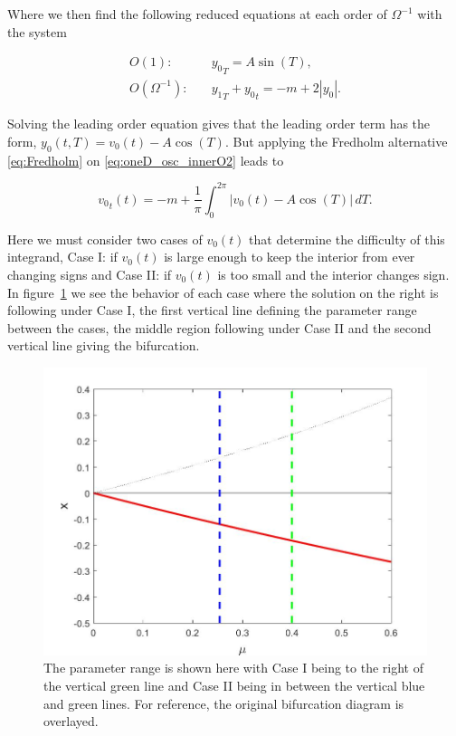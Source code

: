 Where we then find the following reduced equations at each order of $\Omega^{-1}$ with the system

\begin{align}
\label{eq:oneD_osc_innerO1}
O(1):\quad & {y_0}_T = A\sin(T),\\
\label{eq:oneD_osc_innerO2}
O(\Omega^{-1}):\quad & {y_1}_T+{y_0}_t =  -m+2|y_0|.
\end{align}

Solving the leading order equation \label{eq:oneD_osc_innerO1} gives that the leading order term has the form, $y_0(t,T)=v_0(t)-A\cos(T)$. But applying the Fredholm alternative \eqref{eq:Fredholm} on \eqref{eq:oneD_osc_innerO2} leads to

\begin{equation}\label{eq:oneD_osc_integral}
{v_0}_t(t)=-m+\frac{1}{\pi}\int_0^{2\pi} |v_0(t)-A\cos(T)|\,dT.
\end{equation}

Here we must consider two cases of $v_0(t)$ that determine the difficulty of this integrand, Case I: if $v_0(t)$ is large enough to keep the interior from ever changing signs and Case II: if $v_0(t)$ is too small and the interior changes sign. In figure~\ref{fig:oneD_osc_cases} we see the behavior of each case where the solution on the right is following under Case I, the first vertical line defining the parameter range between the cases, the middle region following under Case II and the second vertical line giving the bifurcation.

\begin{figure}[H]
\centering
\includegraphics[width=.7\textwidth]{oneD/osc_cases.jpg}
\caption{The parameter range is shown here with Case I being to the right of the vertical green line and Case II being in between the vertical blue and green lines. For reference, the original bifurcation diagram is overlayed.}
\label{fig:oneD_osc_cases}
\end{figure}

